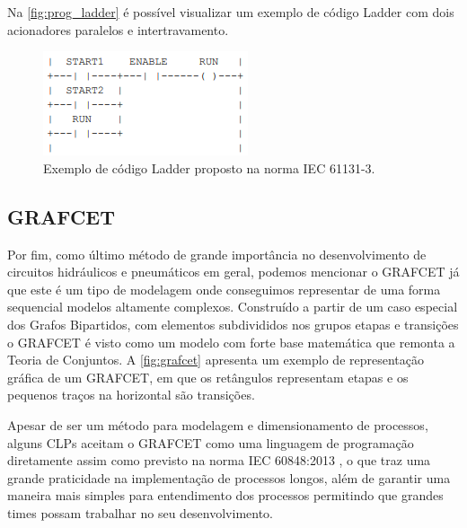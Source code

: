 Na \autoref{fig:prog_ladder} é possível visualizar um exemplo de código Ladder com dois acionadores paralelos e 
intertravamento.

\begin{figure}[htb]
    \begin{center}
	    \includegraphics{figs/ladder-diag.png}
	\end{center}
	\caption{\label{fig:prog_ladder} Exemplo de código Ladder proposto na norma IEC 61131-3.} 
\end{figure}

\subsection{GRAFCET}

Por fim, como último método de grande importância no desenvolvimento de circuitos hidráulicos e pneumáticos em geral, 
podemos mencionar o \ac{GRAFCET} já que este é um tipo de modelagem onde conseguimos representar de uma forma sequencial
modelos altamente complexos. Construído a partir de um caso especial dos Grafos Bipartidos, com elementos subdivididos 
nos grupos etapas e transições o \ac{GRAFCET} é visto como um modelo com forte base
matemática que remonta a Teoria de Conjuntos. A \autoref{fig:grafcet} apresenta um exemplo de representação gráfica de um 
\ac{GRAFCET}, em que os retângulos representam etapas e os pequenos traços na horizontal são transições.

Apesar de ser um método para modelagem e dimensionamento de processos, alguns \ac{CLP}s aceitam o \ac{GRAFCET} como uma
linguagem de programação diretamente assim como previsto na norma IEC 60848:2013 \cite{IEC-60848:2013}, o que traz uma 
grande praticidade na implementação de processos longos, além de garantir uma maneira mais simples para entendimento dos 
processos permitindo que grandes times possam trabalhar no seu desenvolvimento.

